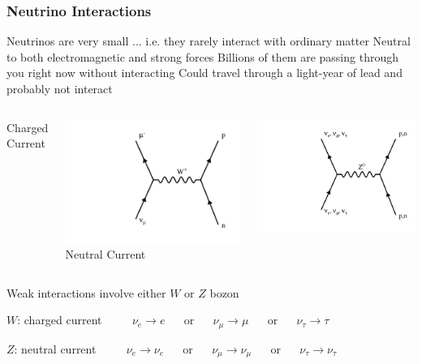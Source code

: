 \documentclass[10pt,professionalfonts,xcolor=table]{beamer}
\begin{document}
\begin{frame}
  \frametitle{Neutrino Interactions}

  \bangon
  \bang Neutrinos are very small
    \bangon
    \bing ... i.e. they rarely interact with ordinary matter
    \bing Neutral to both electromagnetic and strong forces
    \bing Billions of them are passing through you right now without interacting
    \bing Could travel through a light-year of lead and probably not interact
    \bangoff
    \bangoff
    \gap
    \begin{columns}
  \centering
  \textcolor{custom_red}{Charged Current}


  \includegraphics[height=0.37\textheight, angle=-90]{figures/feynman/ccNumu.pdf}
  \centering
   \textcolor{custom_red}{Neutral Current}


  \includegraphics[height=0.37\textheight, angle=-90]{figures/feynman/ncHad.pdf}
  \end{columns}
\gap
    \bangon
    \item Weak interactions involve either $W$ or $Z$ bozon
      \bangon
      \item $W$: charged current
      \bong ~~~~ $\nu_e \rightarrow e$ ~~ or ~~ $\nu_\mu \rightarrow \mu$ ~~ or ~~ $\nu_\tau \rightarrow \tau$
      \item $Z$: neutral current
      \bong ~~~~ $\nu_e \rightarrow \nu_e$ ~~ or ~~ $\nu_\mu \rightarrow \nu_\mu$ ~~ or ~~ $\nu_\tau \rightarrow \nu_\tau$
      \bangoff
    \bangoff


\end{frame}
\end{document}
